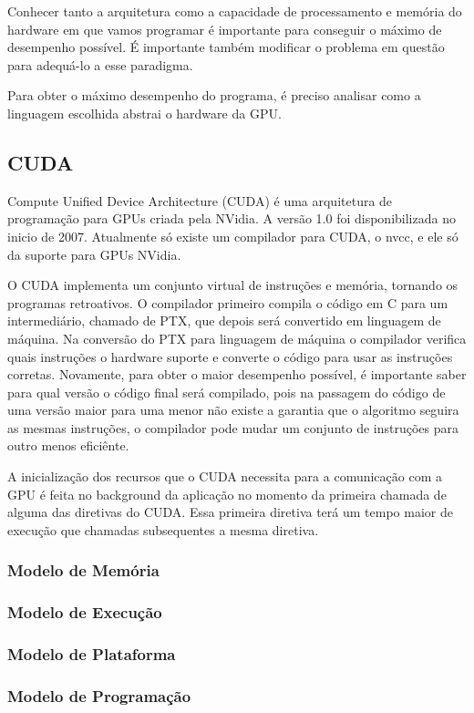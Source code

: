 Conhecer tanto a arquitetura como a capacidade de processamento e memória do hardware em que vamos programar é 
importante para conseguir o máximo de desempenho possível. É importante também modificar o problema em questão 
para adequá-lo a esse paradigma.

Para obter o máximo desempenho do programa, é preciso analisar como a linguagem escolhida abstrai o hardware da GPU.

\subsection{CUDA}
Compute Unified Device Architecture (CUDA) é uma arquitetura de programação para GPUs criada pela NVidia.
A versão 1.0 foi disponibilizada no inicio de 2007. Atualmente só existe um compilador para CUDA, o nvcc,
e ele só da suporte para GPUs NVidia.

O CUDA implementa um conjunto virtual de instruções e memória, tornando os programas retroativos. O compilador
primeiro compila o código em C para um intermediário, chamado de PTX, que depois será convertido em linguagem
de máquina. Na conversão do PTX para linguagem de máquina o compilador verifica quais instruções o hardware
suporte e converte o código para usar as instruções corretas. Novamente, para obter o maior desempenho possível,
é importante saber para qual versão o código final será compilado, pois na passagem do código de uma versão
maior para uma menor não existe a garantia que o algoritmo seguira as mesmas instruções, o compilador pode
mudar um conjunto de instruções para outro menos eficiênte.

A inicialização dos recursos que o CUDA necessita para a comunicação com a GPU é feita no background da
aplicação no momento da primeira chamada de alguma das diretivas do CUDA. Essa primeira diretiva terá um
tempo maior de execução que chamadas subsequentes a mesma diretiva.
\subsubsection{Modelo de Memória}

\subsubsection{Modelo de Execução}
\subsubsection{Modelo de Plataforma}
\subsubsection{Modelo de Programação}
